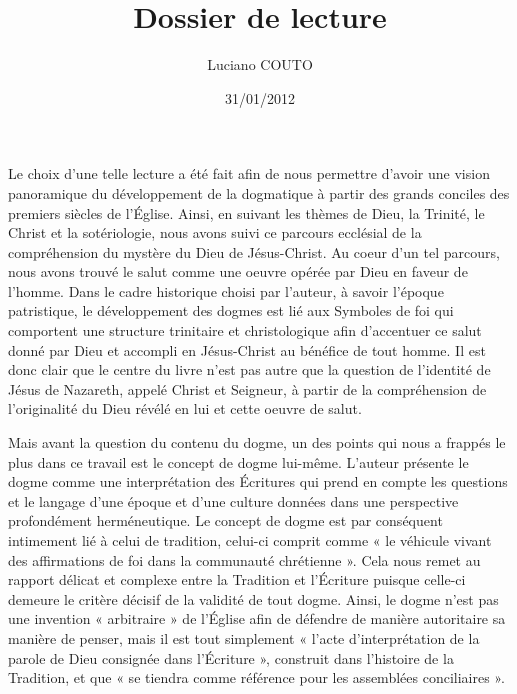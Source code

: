 \documentclass[12pt]{article} %
\title{\vspace{-4ex}Dossier de lecture}
\author{Luciano COUTO}
\date{31/01/2012} %
\begin{document}
\maketitle
\onehalfspace


Le choix d’une telle lecture a été fait afin de nous permettre d’avoir une vision panoramique du développement de la dogmatique à partir des grands conciles des premiers siècles de l’Église. Ainsi, en suivant les thèmes de Dieu, la Trinité, le Christ et la sotériologie, nous avons suivi ce parcours ecclésial de la compréhension du mystère du Dieu de Jésus-Christ. Au coeur d’un tel parcours, nous avons trouvé le salut comme une oeuvre opérée par Dieu en faveur de l’homme. Dans le cadre historique choisi par l’auteur, à savoir l’époque patristique, le développement des dogmes est lié aux Symboles de foi qui comportent une structure trinitaire et christologique afin d’accentuer ce salut donné par Dieu et accompli en Jésus-Christ au bénéfice de tout homme. Il est donc clair que le centre du livre n’est pas autre que la question de l’identité de Jésus de Nazareth, appelé Christ et Seigneur, à partir de la compréhension de l’originalité du Dieu révélé en lui et cette oeuvre de salut. 

Mais avant la question du contenu du dogme, un des points qui nous a frappés le plus dans ce travail est le concept de dogme lui-même. L’auteur présente le dogme comme une interprétation des Écritures qui prend en compte les questions et le langage d’une époque et d’une culture données dans une perspective profondément herméneutique. Le concept de dogme est par conséquent intimement lié à celui de tradition, celui-ci comprit comme « le véhicule vivant des affirmations de foi dans la communauté chrétienne ». Cela nous remet au rapport délicat et complexe entre la Tradition et l’Écriture puisque celle-ci demeure le critère décisif de la validité de tout dogme. Ainsi, le dogme n’est pas une invention « arbitraire » de l’Église afin de défendre de manière autoritaire sa manière de penser, mais il est tout simplement « l’acte d’interprétation de la parole de Dieu consignée dans l’Écriture », construit dans l’histoire de la Tradition, et que « se tiendra comme référence pour les assemblées conciliaires ». 
\end{document}
